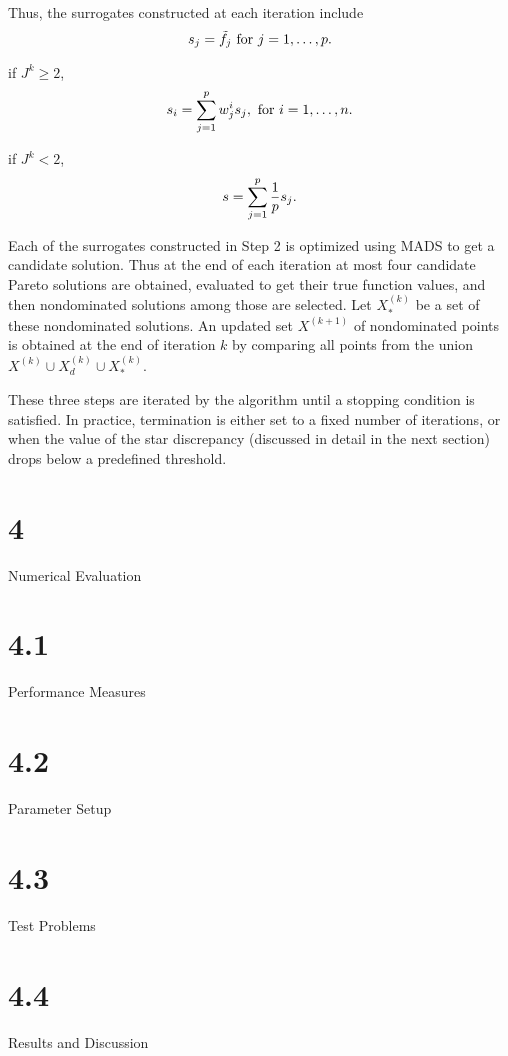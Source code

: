 \par\noindent Thus, the surrogates constructed at each iteration include 
 $$s_j = \tilde f_j \hbox{ for } j=1, \ldots, p.$$

\par\noindent if $J^k \ge 2$,\quad 
$$s_i =\sum_{j=1}^p w_j^{i}s_j, \hbox{ for } i=1, \ldots, n.$$

\par\noindent if $J^k < 2$,\quad  
$$s = \sum_{j=1}^p {1\over{p}}s_j.$$\smallskip

\smallskip

\noindent Each of the surrogates constructed in Step 2 is optimized using MADS 
to get a candidate solution. Thus at the end of each iteration at most four 
candidate Pareto solutions are obtained, evaluated to get their true function 
values, and then nondominated solutions among those are selected. Let $X_*^{
(k)}$ be a set of these nondominated solutions. An updated set $X^{(k+1)}$ of 
nondominated points is obtained at the end of iteration $k$ by comparing all 
points from the  union $X^{(k)}\cup X_d^{(k)}\cup X_*^{(k)}$.

These three steps are iterated by the algorithm until a stopping 
condition is satisfied. In practice, termination is either set to a fixed 
number of iterations, or when the value of the star discrepancy (discussed 
in detail in the next section) drops below a predefined threshold.
\vskip -3pt

\section{4}{Numerical Evaluation}\vskip -3pt
\section{4.1}{Performance Measures}
\section{4.2}{Parameter Setup}
\section{4.3}{Test Problems}\vskip -3pt
\section{4.4}{Results and Discussion}\vskip -3pt

